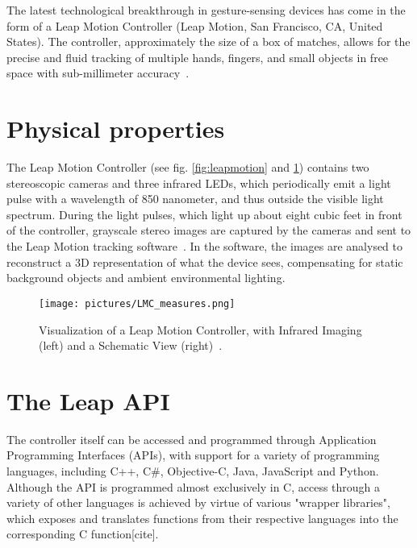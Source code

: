 
The latest technological breakthrough in gesture-sensing devices has come in the form of a Leap Motion Controller (Leap Motion, San Francisco, CA, United States). 
The controller, approximately the size of a box of matches, allows for the precise and fluid tracking of multiple hands, fingers, and small objects in free space with 
sub-millimeter accuracy~\citep{Guna2014}.

\section{Physical properties}
The Leap Motion Controller (see fig. \ref{fig:leapmotion} and \ref{fig:leapmotion2}) contains two stereoscopic cameras and three infrared LEDs, 
which periodically emit a light pulse with a wavelength of 850 nanometer, and thus outside the visible light spectrum. During the light pulses, 
which light up about eight cubic feet in front of the controller, grayscale stereo images are captured by the cameras and sent to the 
Leap Motion tracking software~\citep{LeapMotion2016}. In the software, the images are analysed to reconstruct a 3D representation of what the device sees, 
compensating for static background objects and ambient environmental lighting. 

\begin{figure}%
	\texttt{[image: pictures/LMC\_measures.png]}
	\caption[Visualization of a Leap Motion Controller]{Visualization of a Leap Motion Controller, with Infrared Imaging (left) and a Schematic View (right)~\citep{Weichert2013}.}
	\label{fig:leapmotion2}
\end{figure} 

\section{The Leap API}
The controller itself can be accessed and programmed through Application Programming Interfaces (APIs), with support for a variety of programming languages, including C++, C\#, Objective-C, Java, JavaScript and Python. Although the API is programmed almost exclusively in C, access through a variety of other languages is achieved by virtue of various "wrapper libraries", which exposes and translates functions from their respective languages into the corresponding C function[cite].

